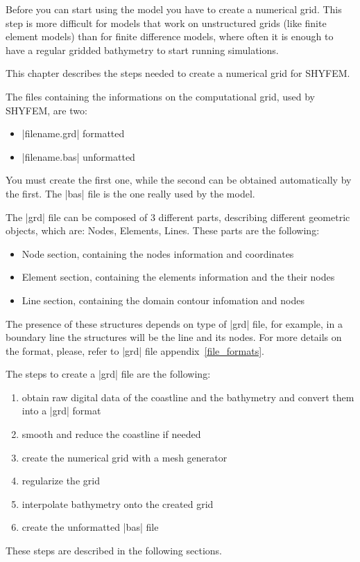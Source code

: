 
Before you can start using the model you have to create a numerical grid.
This step is more difficult for models that work on unstructured grids
(like finite element models) than for finite difference models, where
often it is enough to have a regular gridded bathymetry to start running
simulations.

This chapter describes the steps needed to create a numerical grid for SHYFEM.

The files containing the informations on the computational grid, used by SHYFEM, are two:

\begin{itemize}
\item |filename.grd| formatted
\item |filename.bas| unformatted
\end{itemize}

You must create the first one, while the second can be obtained automatically by
the first. The |bas| file is the one really used by the model.

The |grd| file can be composed of 3 different parts, describing different geometric
objects, which are: Nodes, Elements, Lines. These parts are the following:

\begin{itemize}
\item Node section, containing the nodes information and coordinates
\item Element section, containing the elements information and the their nodes
\item Line section, containing the domain contour infomation and nodes
\end{itemize}

The presence of these structures depends on type of |grd| file, for example,
in a boundary line the structures will be the line and its nodes.
For more details on the format, please, refer to |grd| file appendix~\ref{file_formats}.

The steps to create a |grd| file are the following:

\begin{enumerate}

\item obtain raw digital data of the coastline and the bathymetry and
  convert them into a |grd| format

\item smooth and reduce the coastline if needed

\item create the numerical grid with a mesh generator

\item regularize the grid

\item interpolate bathymetry onto the created grid

\item create the unformatted |bas| file

\end{enumerate}

These steps are described in the following sections.
